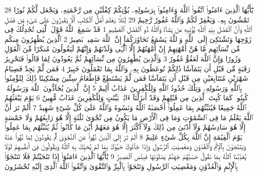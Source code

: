 {\tiny\colorbox{cl_aya}{28}} يَٰٓأَيُّهَا ٱلَّذِينَ ءَامَنُوا۟ ٱتَّقُوا۟ ٱللَّهَ وَءَامِنُوا۟ بِرَسُولِهِۦ يُؤْتِكُمْ كِفْلَيْنِ مِن رَّحْمَتِهِۦ وَيَجْعَل لَّكُمْ نُورًا تَمْشُونَ بِهِۦ وَيَغْفِرْ لَكُمْ وَٱللَّهُ غَفُورٌ رَّحِيمٌ
{\tiny\colorbox{cl_aya}{29}} لِّئَلَّا يَعْلَمَ أَهْلُ ٱلْكِتَٰبِ أَلَّا يَقْدِرُونَ عَلَىٰ شَىْءٍ مِّن فَضْلِ ٱللَّهِ وَأَنَّ ٱلْفَضْلَ بِيَدِ ٱللَّهِ يُؤْتِيهِ مَن يَشَآءُ وَٱللَّهُ ذُو ٱلْفَضْلِ ٱلْعَظِيمِ
{\tiny\colorbox{cl_aya}{1}} قَدْ سَمِعَ ٱللَّهُ قَوْلَ ٱلَّتِى تُجَٰدِلُكَ فِى زَوْجِهَا وَتَشْتَكِىٓ إِلَى ٱللَّهِ وَٱللَّهُ يَسْمَعُ تَحَاوُرَكُمَآ إِنَّ ٱللَّهَ سَمِيعٌۢ بَصِيرٌ
{\tiny\colorbox{cl_aya}{2}} ٱلَّذِينَ يُظَٰهِرُونَ مِنكُم مِّن نِّسَآئِهِم مَّا هُنَّ أُمَّهَٰتِهِمْ إِنْ أُمَّهَٰتُهُمْ إِلَّا ٱلَّٰٓـِٔى وَلَدْنَهُمْ وَإِنَّهُمْ لَيَقُولُونَ مُنكَرًا مِّنَ ٱلْقَوْلِ وَزُورًا وَإِنَّ ٱللَّهَ لَعَفُوٌّ غَفُورٌ
{\tiny\colorbox{cl_aya}{3}} وَٱلَّذِينَ يُظَٰهِرُونَ مِن نِّسَآئِهِمْ ثُمَّ يَعُودُونَ لِمَا قَالُوا۟ فَتَحْرِيرُ رَقَبَةٍ مِّن قَبْلِ أَن يَتَمَآسَّا ذَٰلِكُمْ تُوعَظُونَ بِهِۦ وَٱللَّهُ بِمَا تَعْمَلُونَ خَبِيرٌ
{\tiny\colorbox{cl_aya}{4}} فَمَن لَّمْ يَجِدْ فَصِيَامُ شَهْرَيْنِ مُتَتَابِعَيْنِ مِن قَبْلِ أَن يَتَمَآسَّا فَمَن لَّمْ يَسْتَطِعْ فَإِطْعَامُ سِتِّينَ مِسْكِينًا ذَٰلِكَ لِتُؤْمِنُوا۟ بِٱللَّهِ وَرَسُولِهِۦ وَتِلْكَ حُدُودُ ٱللَّهِ وَلِلْكَٰفِرِينَ عَذَابٌ أَلِيمٌ
{\tiny\colorbox{cl_aya}{5}} إِنَّ ٱلَّذِينَ يُحَآدُّونَ ٱللَّهَ وَرَسُولَهُۥ كُبِتُوا۟ كَمَا كُبِتَ ٱلَّذِينَ مِن قَبْلِهِمْ وَقَدْ أَنزَلْنَآ ءَايَٰتٍۭ بَيِّنَٰتٍ وَلِلْكَٰفِرِينَ عَذَابٌ مُّهِينٌ
{\tiny\colorbox{cl_aya}{6}} يَوْمَ يَبْعَثُهُمُ ٱللَّهُ جَمِيعًا فَيُنَبِّئُهُم بِمَا عَمِلُوٓا۟ أَحْصَىٰهُ ٱللَّهُ وَنَسُوهُ وَٱللَّهُ عَلَىٰ كُلِّ شَىْءٍ شَهِيدٌ
{\tiny\colorbox{cl_aya}{7}} أَلَمْ تَرَ أَنَّ ٱللَّهَ يَعْلَمُ مَا فِى ٱلسَّمَٰوَٰتِ وَمَا فِى ٱلْأَرْضِ مَا يَكُونُ مِن نَّجْوَىٰ ثَلَٰثَةٍ إِلَّا هُوَ رَابِعُهُمْ وَلَا خَمْسَةٍ إِلَّا هُوَ سَادِسُهُمْ وَلَآ أَدْنَىٰ مِن ذَٰلِكَ وَلَآ أَكْثَرَ إِلَّا هُوَ مَعَهُمْ أَيْنَ مَا كَانُوا۟ ثُمَّ يُنَبِّئُهُم بِمَا عَمِلُوا۟ يَوْمَ ٱلْقِيَٰمَةِ إِنَّ ٱللَّهَ بِكُلِّ شَىْءٍ عَلِيمٌ
{\tiny\colorbox{cl_aya}{8}} أَلَمْ تَرَ إِلَى ٱلَّذِينَ نُهُوا۟ عَنِ ٱلنَّجْوَىٰ ثُمَّ يَعُودُونَ لِمَا نُهُوا۟ عَنْهُ وَيَتَنَٰجَوْنَ بِٱلْإِثْمِ وَٱلْعُدْوَٰنِ وَمَعْصِيَتِ ٱلرَّسُولِ وَإِذَا جَآءُوكَ حَيَّوْكَ بِمَا لَمْ يُحَيِّكَ بِهِ ٱللَّهُ وَيَقُولُونَ فِىٓ أَنفُسِهِمْ لَوْلَا يُعَذِّبُنَا ٱللَّهُ بِمَا نَقُولُ حَسْبُهُمْ جَهَنَّمُ يَصْلَوْنَهَا فَبِئْسَ ٱلْمَصِيرُ
{\tiny\colorbox{cl_aya}{9}} يَٰٓأَيُّهَا ٱلَّذِينَ ءَامَنُوٓا۟ إِذَا تَنَٰجَيْتُمْ فَلَا تَتَنَٰجَوْا۟ بِٱلْإِثْمِ وَٱلْعُدْوَٰنِ وَمَعْصِيَتِ ٱلرَّسُولِ وَتَنَٰجَوْا۟ بِٱلْبِرِّ وَٱلتَّقْوَىٰ وَٱتَّقُوا۟ ٱللَّهَ ٱلَّذِىٓ إِلَيْهِ تُحْشَرُونَ
